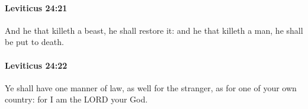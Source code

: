 		\paragraph{Leviticus 24:21} %
			\label{LEVITICUS-24-21}

			And he that killeth a beast, he shall restore it: and he that killeth a man, he shall be put to death.


		\paragraph{Leviticus 24:22} %
			\label{LEVITICUS-24-22}

			Ye shall have one manner of law, as well for the stranger, as for one of your own country: for I am the LORD your God.


